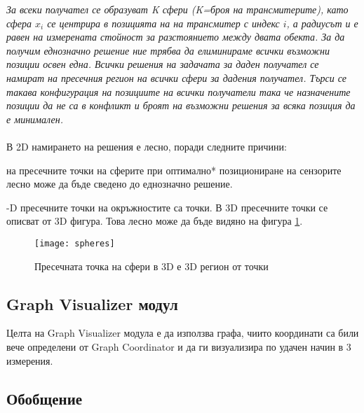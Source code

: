 \textit{За всеки получател се образуват K сфери (K=броя на трансмитерите), като сфера $x_i$ се центрира в позицията на на трансмитер с индекс $i$, а радиусът и е равен на измерената стойност за разстоянието между двата обекта. За да получим еднозначно решение ние трябва да елиминираме всички възможни позиции освен една. Всички решения на задачата за даден получател се намират на пресечния регион на всички сфери за дадения получател. Търси се такава конфигурация на позициите на всички получатели така че назначените позиции да не са в конфликт и броят на възможни решения за всяка позиция да е минимален.}\\\\

В 2D намирането на решения е лесно, поради следните причини:

\begin{enumerate}
     на пресечните точки на сферите при оптимално* позициониране на сензорите лесно може да бъде сведено до еднозначно решение.

    -D пресечните точки на окръжностите са точки. В 3D пресечните точки се описват от 3D фигура. Това лесно може да бъде видяно на фигура \ref{spheres}.
\end{enumerate}

\begin{figure}
    \centerline{\texttt{[image: spheres]}}
    \caption{Пресечната точка на сфери в 3D е 3D регион от точки}
    \label{spheres}
\end{figure}

\pagebreak

\subsection{Graph Visualizer модул}
Целта на Graph Visualizer модула е да използва графа, чиито координати са били вече определени от Graph Coordinator и да ги визуализира по удачен начин в 3 измерения.


\subsection{Обобщение}
